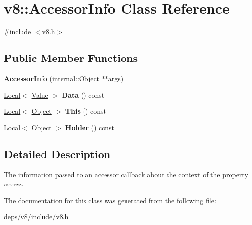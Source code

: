 \hypertarget{classv8_1_1_accessor_info}{}\section{v8\+:\+:Accessor\+Info Class Reference}
\label{classv8_1_1_accessor_info}


{\ttfamily \#include $<$v8.\+h$>$}

\subsection*{Public Member Functions}
\begin{DoxyCompactItemize}
\item 
\hypertarget{classv8_1_1_accessor_info_a4cf463121a7ca7f966145b1e16169b93}{}{\bfseries Accessor\+Info} (internal\+::\+Object $\ast$$\ast$args)\label{classv8_1_1_accessor_info_a4cf463121a7ca7f966145b1e16169b93}

\item 
\hypertarget{classv8_1_1_accessor_info_a5731988db2cf66eb3cc7f757832d12f9}{}\hyperlink{classv8_1_1_local}{Local}$<$ \hyperlink{classv8_1_1_value}{Value} $>$ {\bfseries Data} () const \label{classv8_1_1_accessor_info_a5731988db2cf66eb3cc7f757832d12f9}

\item 
\hypertarget{classv8_1_1_accessor_info_afc7740ab0665f232f9f956a7e3ac6422}{}\hyperlink{classv8_1_1_local}{Local}$<$ \hyperlink{classv8_1_1_object}{Object} $>$ {\bfseries This} () const \label{classv8_1_1_accessor_info_afc7740ab0665f232f9f956a7e3ac6422}

\item 
\hypertarget{classv8_1_1_accessor_info_a1305bf63887da131db381122d34c7193}{}\hyperlink{classv8_1_1_local}{Local}$<$ \hyperlink{classv8_1_1_object}{Object} $>$ {\bfseries Holder} () const \label{classv8_1_1_accessor_info_a1305bf63887da131db381122d34c7193}

\end{DoxyCompactItemize}


\subsection{Detailed Description}
The information passed to an accessor callback about the context of the property access. 

The documentation for this class was generated from the following file\+:\begin{DoxyCompactItemize}
\item 
deps/v8/include/v8.\+h\end{DoxyCompactItemize}
